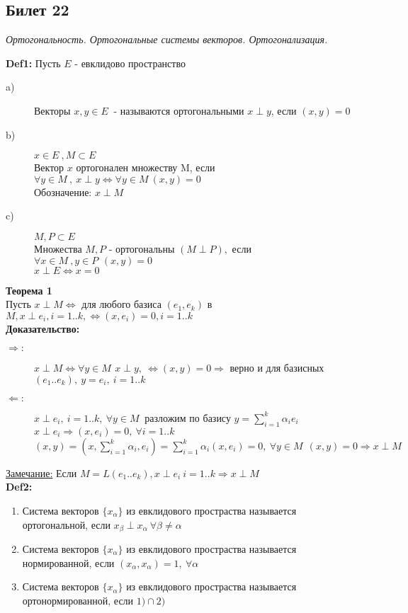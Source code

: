 \subsection{Билет 22}


\textit{Ортогональность. Ортогональные системы векторов. Ортогонализация.}


\textbf{Def1: } Пусть $E$ - евклидово пространство
\begin{description}
 \item [a)] Векторы $x,y \in E\ $ - называются ортогональными $x \perp y$, если $\left( x,y \right)=0$
 \item [b)] $x \in E\ , M \subset E$ \\
	Вектор $x$ ортогонален множеству M, если $\forall y \in M\ , \ x \perp y \Leftrightarrow \forall y \in M\ \left( x,y \right) = 0 $ \\
	Обозначение: $x \perp M$ 
 \item [c)] $M,P \subset E$ \\
	Множества $M,P$ - ортогональны $\left( M \perp P \right),$ если $\forall x \in M\ , y \in P\, \ \left( x,y \right)=0  $ \\
	$x \perp E \Leftrightarrow x=0 $
\end{description} 
\textbf{Теорема 1} \\
 Пусть $x \perp M \Leftrightarrow$ для любого базиса $(e_1,e_k)$ в $M,  x \perp e_i,  i=1..k,  \Leftrightarrow (x,e_i)=0, i=1..k $ \\
\textbf{Доказательство:} \\
\begin{description}
 \item [$\Rightarrow :$] $x \perp M \Leftrightarrow \forall y \in M\, \ x \perp y, \ \Leftrightarrow (x,y)=0 \Rightarrow$ верно и для базисных 
	$(e_1..e_k), \ y=e_i, \ i=1..k$
 \item [$\Leftarrow :$] $x \perp e_i, \ i=1..k, \ \forall y \in M\ $ разложим по базису $y = \sum \limits_{i=1}^k {\alpha_i e_i}$ \\
	$x \perp e_i \Rightarrow (x,e_i)=0, \ \forall i=1..k$ \\
	$(x,y)=(x,\sum \limits_{i=1}^k {\alpha_i,e_i}) = \sum \limits_{i=1}^k {\alpha_i (x,e_i) = 0, \ \forall y \in M\ \ (x,y)=0 \Rightarrow x \perp M } $
\end{description}
\underline{Замечание:} Если $M=L(e_1..e_k), x \perp e_i \ i=1..k \Rightarrow x \perp M $ \\
\textbf{Def2: } 
\begin{enumerate}
 \item Система векторов $\{x_{\alpha}\}$ из евклидового простраства называется ортогональной, если $x_{\beta} \perp x_{\alpha} \ \forall \beta \ne \alpha$
 \item Система векторов $\{x_{\alpha}\}$ из евклидового простраства называется нормированной, если $(x_{\alpha},x_{\alpha})=1, \ \forall \alpha$
 \item Система векторов $\{x_{\alpha}\}$ из евклидового простраства называется ортонормированной, если $1) \cap 2)$
\end{enumerate}
